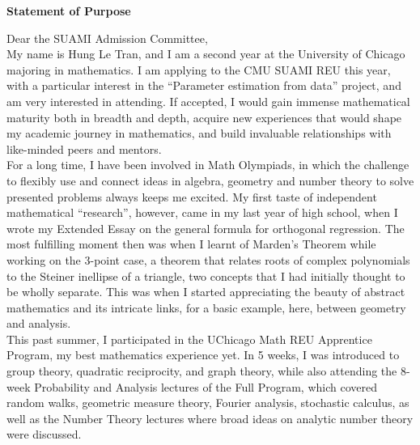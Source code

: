 \documentclass[a4paper, 11pt]{extarticle}
\begin{document}
\pagestyle{empty}
\begin{center}
    \textbf{\Large{Statement of Purpose}}
\end{center}

Dear the SUAMI Admission Committee,\\

My name is Hung Le Tran, and I am a second year at the University of Chicago majoring in mathematics. I am applying to the CMU SUAMI REU this year, with a particular interest in the ``Parameter estimation from data'' project, and am very interested in attending. If accepted, I would gain immense mathematical maturity both in breadth and depth, acquire new experiences that would shape my academic journey in mathematics, and build invaluable relationships with like-minded peers and mentors.\\

For a long time, I have been involved in Math Olympiads, in which the challenge to flexibly use and connect ideas in algebra, geometry and number theory to solve presented problems always keeps me excited. My first taste of independent mathematical “research”, however, came in my last year of high school, when I wrote my Extended Essay on the general formula for orthogonal regression. The most fulfilling moment then was when I learnt of Marden's Theorem while working on the 3-point case, a theorem that relates roots of complex polynomials to the Steiner inellipse of a triangle, two concepts that I had initially thought to be wholly separate. This was when I started appreciating the beauty of abstract mathematics and its intricate links, for a basic example, here, between geometry and analysis.\\

This past summer, I participated in the UChicago Math REU Apprentice Program, my best mathematics experience yet. In 5 weeks, I was introduced to group theory, quadratic reciprocity, and graph theory, while also attending the 8-week Probability and Analysis lectures of the Full Program, which covered random walks, geometric measure theory, Fourier analysis, stochastic calculus, as well as the Number Theory lectures where broad ideas on analytic number theory were discussed.\\
\end{document}
